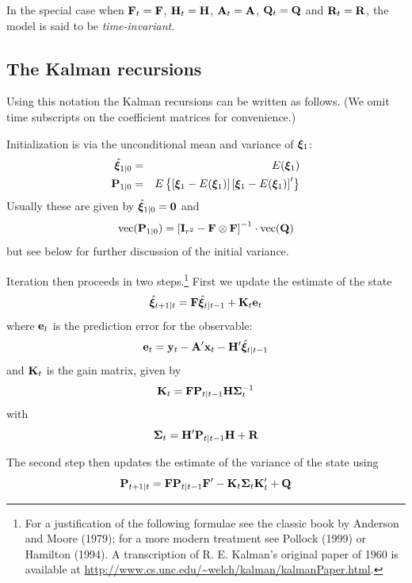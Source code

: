 \documentclass[a4paper]{article}
\newcommand{\obsvec}{\ensuremath\mathbf{y}}
\newcommand{\obsmat}{\ensuremath\mathbf{H}}
\newcommand{\obsx}{\ensuremath\mathbf{x}}
\newcommand{\obsxmat}{\ensuremath\mathbf{A}}
\newcommand{\obsvar}{\ensuremath\mathbf{R}}
\newcommand{\statevec}{\ensuremath\mathbf{\bm \xi}}
\newcommand{\statemat}{\ensuremath\mathbf{F}}
\newcommand{\strvar}{\ensuremath\mathbf{Q}}
\newcommand{\statevar}{\ensuremath\mathbf{P}}
\newcommand{\gain}{\ensuremath\mathbf{K}}
\newcommand{\prederr}{\ensuremath\mathbf{e}}
\newcommand{\predvar}{\ensuremath{\bm\Sigma}}
\newcommand{\myvec}{\mbox{vec}}
\begin{document}
In the special case when $\statemat_t = \statemat$, $\obsmat_t = \obsmat$,
$\obsxmat_t = \obsxmat$, $\strvar_t = \strvar$ and $\obsvar_t =
\obsvar$, the model is said to be \emph{time-invariant}.

\subsection{The Kalman recursions}

Using this notation the Kalman recursions can be written as follows.
(We omit time subscripts on the coefficient matrices for convenience.)

Initialization is via the unconditional mean and variance of
$\statevec_1$:
%
\begin{eqnarray*}
\hat{\statevec}_{1|0} &=& E(\statevec_1) \\
\statevar_{1|0} &=& E\left\{\left[\statevec_1 - E(\statevec_1)\right]
   \left[\statevec_1 - E(\statevec_1)\right]' \right\}
\end{eqnarray*}
Usually these are given by $\hat{\statevec}_{1|0} = \mathbf{0}$ and
\begin{equation}
\label{eq:inivar}
\myvec(\statevar_{1|0}) = \left[\mathbf{I}_{r^2} - \statemat \otimes
  \statemat\right]^{-1} \cdot \myvec(\strvar)
\end{equation}
but see below for further discussion of the initial variance.

Iteration then proceeds in two steps.\footnote{For a justification of
  the following formulae see the classic book by Anderson and Moore
  (1979); for a more modern treatment see Pollock (1999) or Hamilton
  (1994).  A transcription of R. E. Kalman's original paper of 1960 is
  available at
  \url{http://www.cs.unc.edu/~welch/kalman/kalmanPaper.html}.}  First
we update the estimate of the state
%
\begin{equation}
\hat{\statevec}_{t+1|t} = \statemat\hat{\statevec}_{t|t-1} + 
  \gain_t \prederr_t
\end{equation}
%
where $\prederr_t$ is the prediction error for the observable:
\[
\prederr_t = \obsvec_t - \obsxmat'\obsx_t - \obsmat' \hat{\statevec}_{t|t-1}
\]
%
and $\gain_t$ is the gain matrix, given by
%
\begin{equation}
\label{eq:gain}
\gain_t = \statemat\statevar_{t|t-1}\obsmat \predvar_t^{-1}
\end{equation}
%
with
%
\[
\predvar_t = \obsmat'\statevar_{t|t-1}\obsmat + \obsvar
\]

The second step then updates the estimate of the variance of the state
using
%
\begin{equation}
\statevar_{t+1|t} = \statemat\statevar_{t|t-1}\statemat' -
 \gain_t \predvar_t \gain_t' + \strvar
\end{equation}
\end{document}
